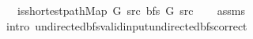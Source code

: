 \begin{isabellebody}
\ \ \ {\isachardoublequoteopen}is{\isacharunderscore}{\kern0pt}shortest{\isacharunderscore}{\kern0pt}path{\isacharunderscore}{\kern0pt}Map\ G\ src\ {\isacharparenleft}{\kern0pt}bfs\ G\ src{\isacharparenright}{\kern0pt}{\isachardoublequoteclose}\isanewline
%
\isadelimproof
\ \ %
\endisadelimproof
%
\isatagproof
{}\isamarkupfalse%
\ assms\isanewline
\ \ \isamarkupfalse%
\ {\isacharparenleft}{\kern0pt}intro\ undirected{\isacharunderscore}{\kern0pt}bfs{\isacharunderscore}{\kern0pt}valid{\isacharunderscore}{\kern0pt}input{\isachardot}{\kern0pt}undirected{\isacharunderscore}{\kern0pt}bfs{\isacharunderscore}{\kern0pt}correct{\isacharparenright}{\kern0pt}%
\endisatagproof
{\isafoldproof}%
%
\isadelimproof
\isanewline
%
\endisadelimproof
%
\isadelimtheory
\isanewline
%
\endisadelimtheory
%
\isatagtheory
{}\isamarkupfalse%
%
\endisatagtheory
{\isafoldtheory}%
%
\isadelimtheory
%
\endisadelimtheory
%
\end{isabellebody}%
\endinput
